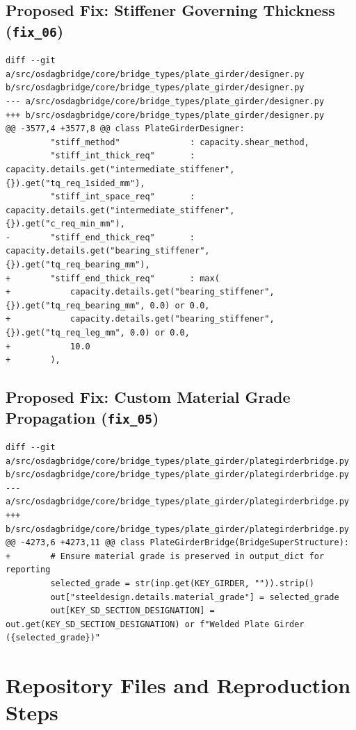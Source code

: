 \documentclass[11pt,a4paper]{article}
\begin{document}
\subsection{Proposed Fix: Stiffener Governing Thickness (\texttt{fix\_06})}
\begin{lstlisting}
diff --git a/src/osdagbridge/core/bridge_types/plate_girder/designer.py b/src/osdagbridge/core/bridge_types/plate_girder/designer.py
--- a/src/osdagbridge/core/bridge_types/plate_girder/designer.py
+++ b/src/osdagbridge/core/bridge_types/plate_girder/designer.py
@@ -3577,4 +3577,8 @@ class PlateGirderDesigner:
         "stiff_method"              : capacity.shear_method,
         "stiff_int_thick_req"       : capacity.details.get("intermediate_stiffener", {}).get("tq_req_1sided_mm"),
         "stiff_int_space_req"       : capacity.details.get("intermediate_stiffener", {}).get("c_req_min_mm"),
-        "stiff_end_thick_req"       : capacity.details.get("bearing_stiffener", {}).get("tq_req_bearing_mm"),
+        "stiff_end_thick_req"       : max(
+            capacity.details.get("bearing_stiffener", {}).get("tq_req_bearing_mm", 0.0) or 0.0,
+            capacity.details.get("bearing_stiffener", {}).get("tq_req_leg_mm", 0.0) or 0.0,
+            10.0
+        ),
\end{lstlisting}

\subsection{Proposed Fix: Custom Material Grade Propagation (\texttt{fix\_05})}
\begin{lstlisting}
diff --git a/src/osdagbridge/core/bridge_types/plate_girder/plategirderbridge.py b/src/osdagbridge/core/bridge_types/plate_girder/plategirderbridge.py
--- a/src/osdagbridge/core/bridge_types/plate_girder/plategirderbridge.py
+++ b/src/osdagbridge/core/bridge_types/plate_girder/plategirderbridge.py
@@ -4273,6 +4273,11 @@ class PlateGirderBridge(BridgeSuperStructure):
+        # Ensure material grade is preserved in output_dict for reporting
         selected_grade = str(inp.get(KEY_GIRDER, "")).strip()
         out["steeldesign.details.material_grade"] = selected_grade
         out[KEY_SD_SECTION_DESIGNATION] = out.get(KEY_SD_SECTION_DESIGNATION) or f"Welded Plate Girder ({selected_grade})"
\end{lstlisting}
\FloatBarrier

\section{Repository Files and Reproduction Steps}
\end{document}
